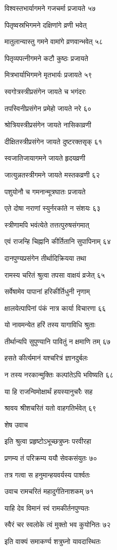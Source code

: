 विश्वस्तभार्यागमने गजचर्मा प्रजायते ५७

पितृष्वस्रभिगमने दक्षिणांगे व्रणी भवेत्

मातुलान्यास्तु गमने वामांगे व्रणवान्भवेत् ५८

पितृव्यपत्नीगमने कटौ कुष्ठः प्रजायते

मित्रभार्याभिगमने मृतभार्यः प्रजायते ५९

स्वगोत्रस्त्रीप्रसंगेन जायते च भगंदरः

तपस्विनीप्रसंगेन प्रमेहो जायते नरे ६०

श्रोत्रियस्त्रीप्रसंगेन जायते नासिकाव्रणी

दीक्षितस्त्रीप्रसंगेन जायते दुष्टरक्तसृक् ६१

स्वजातिजायागमने जायते हृदयव्रणी

जात्युन्नतस्त्रीगमने जायते मस्तकव्रणी ६२

पशुयोनौ च गमनान्मूत्रघातः प्रजायते

एते दोषा नराणां स्युर्नरकांते न संशयः ६३

स्त्रीणामपि भवंत्येते तत्तत्पुरुषसंगमात्

एवं राजन्हि चिह्नानि कीर्तितानि सुपापिनाम् ६४

दानपुण्यप्रसंगेन तीर्थादिक्रियया तथा

रामस्य चरितं श्रुत्वा तपसा वाक्षयं व्रजेत् ६५

सर्वेषामेव पापानां हरिकीर्तिधुनी नृणाम्

क्षालयेत्पापिनां पंकं नात्र कार्या विचारणा ६६

यो नावमन्येत हरिं तस्य यागाविधि श्रुताः

तीर्थान्यपि सुपुण्यानि पावितुं न क्षमाणि तम् ६७

हसते कीर्त्यमानं यश्चरित्रं ज्ञानदुर्बलः

न तस्य नरकान्मुक्तिः कल्पांतेऽपि भविष्यति ६८

या हि राजन्विमोक्षार्थं हयस्यानुचरैः सह

श्रावय श्रीशचरितं यतो वाहगतिर्भवेत् ६९

शेष उवाच

इति श्रुत्वा प्रहृष्टोऽभूच्छत्रुघ्नः परवीरहा

प्रणम्य तं परिक्रम्य ययौ सेवकसंयुतः ७०

तत्र गत्वा स हनुमान्हयवर्यस्य पार्श्वतः

उवाच रामचरितं महादुर्गतिनाशकम् ७१

याहि देव विमानं स्वं रामकीर्तनपुण्यतः

स्वैरं चर स्वलोके त्वं मुक्तो भव कुयोनितः ७२

इति वाक्यं समाकर्ण्य शत्रुघ्नो यावदास्थितः


